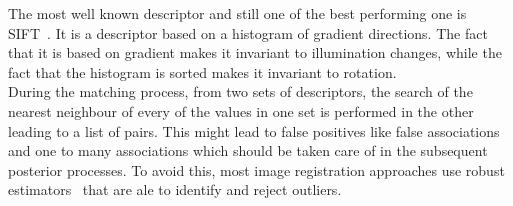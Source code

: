 The most well known descriptor and still one of the best performing one is SIFT~\cite{lowe2004distinctive}. It is a descriptor based on a histogram of gradient directions. The fact that it is based on gradient makes it invariant to illumination changes, while the fact that the histogram is sorted makes it invariant to rotation.\\

During the matching process, from two sets of descriptors, the search of the nearest neighbour of every of the values in one set is performed in the other leading to a list of pairs. This might lead to false positives like false associations and one to many associations which should be taken care of in the subsequent posterior processes. To avoid this, most image registration approaches use robust estimators~\cite{fischler1981random} that are ale to identify and reject outliers.\\





